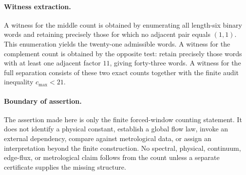\paragraph{Witness extraction.}
A witness for the middle count is obtained by enumerating all length-six binary words and retaining precisely those for which no adjacent pair equals $(1,1)$.  This enumeration yields the twenty-one admissible words.  A witness for the complement count is obtained by the opposite test: retain precisely those words with at least one adjacent factor $11$, giving forty-three words.  A witness for the full separation consists of these two exact counts together with the finite audit inequality $c_{\max}<21$.

\paragraph{Boundary of assertion.}
The assertion made here is only the finite forced-window counting statement.  It does not identify a physical constant, establish a global flow law, invoke an external dependency, compare against metrological data, or assign an interpretation beyond the finite construction.  No spectral, physical, continuum, edge-flux, or metrological claim follows from the count unless a separate certificate supplies the missing structure.
